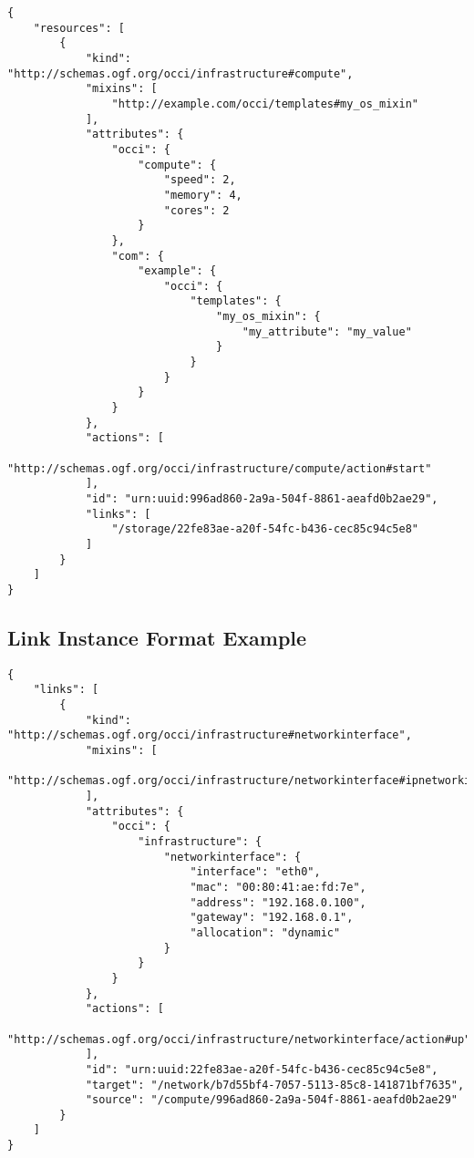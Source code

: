 \documentclass[10pt,a4paper]{article}
\begin{document}
\begin{lstlisting}
{
    "resources": [
        {
            "kind": "http://schemas.ogf.org/occi/infrastructure#compute",
            "mixins": [
                "http://example.com/occi/templates#my_os_mixin"
            ],
            "attributes": {
                "occi": {
                    "compute": {
                        "speed": 2,
                        "memory": 4,
                        "cores": 2
                    }
                },
                "com": {
                    "example": {
                        "occi": {
                            "templates": {
                                "my_os_mixin": {
                                    "my_attribute": "my_value"
                                }
                            }
                        }
                    }
                }
            },
            "actions": [
                "http://schemas.ogf.org/occi/infrastructure/compute/action#start"
            ],
            "id": "urn:uuid:996ad860-2a9a-504f-8861-aeafd0b2ae29",
            "links": [
                "/storage/22fe83ae-a20f-54fc-b436-cec85c94c5e8"
            ]
        }
    ]
}
\end{lstlisting}

\subsection{Link Instance Format Example}
\label{sec:example_link}

\begin{lstlisting}
{
    "links": [
        {
            "kind": "http://schemas.ogf.org/occi/infrastructure#networkinterface",
            "mixins": [
                "http://schemas.ogf.org/occi/infrastructure/networkinterface#ipnetworkinterface"
            ],
            "attributes": {
                "occi": {
                    "infrastructure": {
                        "networkinterface": {
                            "interface": "eth0",
                            "mac": "00:80:41:ae:fd:7e",
                            "address": "192.168.0.100",
                            "gateway": "192.168.0.1",
                            "allocation": "dynamic"
                        }
                    }
                }
            },
            "actions": [
                "http://schemas.ogf.org/occi/infrastructure/networkinterface/action#up"
            ],
            "id": "urn:uuid:22fe83ae-a20f-54fc-b436-cec85c94c5e8",
            "target": "/network/b7d55bf4-7057-5113-85c8-141871bf7635",
            "source": "/compute/996ad860-2a9a-504f-8861-aeafd0b2ae29"
        }
    ]
}
\end{lstlisting}
\end{document}
